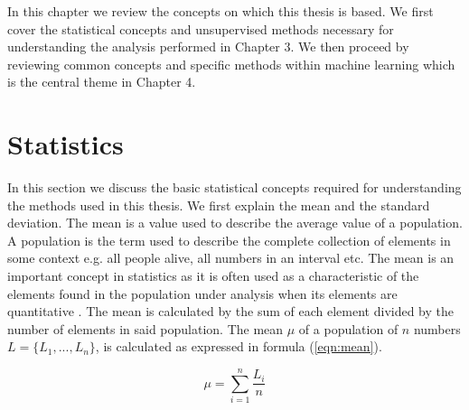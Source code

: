 In this chapter we review the concepts on which this thesis is based. We first cover the statistical concepts and unsupervised methods necessary for understanding the analysis performed in Chapter 3. We then proceed by reviewing common concepts and specific methods within machine learning which is the central theme in Chapter 4.%


\section{Statistics}

In this section we discuss the basic statistical concepts required for understanding the methods used in this thesis. We first explain the mean and the standard deviation. The mean is a value used to describe the average value of a population. A population is the term used to describe the complete collection of elements in some context e.g. all people alive, all numbers in an interval etc. The mean is an important concept in statistics as it is often used as a characteristic of the elements found in the population under analysis when its elements are quantitative \cite{rowntree1981statistics}. The mean is calculated by the sum of each element divided by the number of elements in said population. The mean $\mu$ of a population of $n$ numbers $L = \{L_1, ..., L_n\}$, is calculated as expressed in formula (\ref{eqn:mean}).

\begin{equation}
\label{eqn:mean}
\mu = \sum_{i=1}^n \frac{L_i}{n}
\end{equation}

